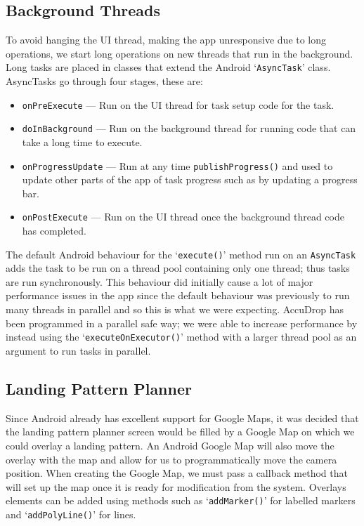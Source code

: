 \subsection{Background Threads}
To avoid hanging the UI thread, making the app unresponsive due to long operations, we start long operations on new threads that run in the background. Long tasks are placed in classes that extend the Android `\texttt{AsyncTask}' class. AsyncTasks go through four stages, these are:
\begin{itemize}
  \item \texttt{onPreExecute} --- Run on the UI thread for task setup code for the task.
  \item \texttt{doInBackground} --- Run on the background thread for running code that can take a long time to execute.
  \item \texttt{onProgressUpdate} --- Run at any time \texttt{publishProgress()} and used to update other parts of the app of task progress such as by updating a progress bar.
  \item \texttt{onPostExecute} --- Run on the UI thread once the background thread code has completed.
\end{itemize}

The default Android behaviour for the `\texttt{execute()}' method run on an \texttt{AsyncTask} adds the task to be run on a thread pool containing only one thread; thus tasks are run synchronously. This behaviour did initially cause a lot of major performance issues in the app since the default behaviour was previously to run many threads in parallel and so this is what we were expecting. AccuDrop has been programmed in a parallel safe way; we were able to increase performance by instead using the `\texttt{executeOnExecutor()}' method with a larger thread pool as an argument to run tasks in parallel.

\subsection{Landing Pattern Planner}
Since Android already has excellent support for Google Maps, it was decided that the landing pattern planner screen would be filled by a Google Map on which we could overlay a landing pattern. An Android Google Map will also move the overlay with the map and allow for us to programmatically move the camera position.
When creating the Google Map, we must pass a callback method that will set up the map once it is ready for modification from the system. Overlays elements can be added using methods such as `\texttt{addMarker()}' for labelled markers and `\texttt{addPolyLine()}' for lines.

